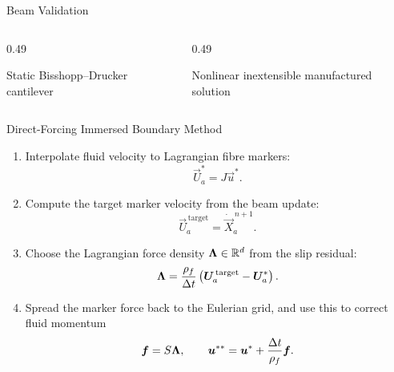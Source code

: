 \documentclass[10pt,english]{beamer}
\begin{document}
\begin{frame}{Beam Validation}
    \begin{columns}[T,onlytextwidth]
        \begin{column}{0.49\textwidth}
            \centering
            

            {\small Static Bisshopp--Drucker cantilever
                \parencite{bisshopp_large_1945}}
        \end{column}
        \begin{column}{0.49\textwidth}
            \centering
            

            {\small Nonlinear inextensible manufactured solution }
        \end{column}
    \end{columns}
\end{frame}

\begin{frame}{Direct-Forcing Immersed Boundary Method}
    \begin{enumerate}
        \item Interpolate fluid velocity to Lagrangian fibre markers:
              \[
                  \vec U_a^* = J\vec u^* .
              \]

        \item Compute the target marker velocity from the beam update:
              \[
                  \vec U_a^{\,\mathrm{target}}
                  =
                  \dot{\vec X}_a^{\,n+1}.
              \]

        \item Choose the Lagrangian force density \(\bm{\Lambda} \in
              \mathbb{R}^d\) from the slip residual:
              \[
                  \bm{\Lambda}
                  =
                  \frac{\rho_f}{\Delta t}
                  \left(
                  \bm{U}_a^{\,\mathrm{target}}
                  -
                  \bm{U}_a^*
                  \right).
              \]

        \item Spread the marker force back to the Eulerian grid, and use this
              to correct fluid momentum
              \[
                  \bm{f} = S\bm{\Lambda}, \qquad
                  \bm{u}^{**}
                  =
                  \bm{u}^*
                  + \frac{\Delta t}{\rho_f} \bm{f} .
              \]
    \end{enumerate}
\end{frame}
\end{document}
